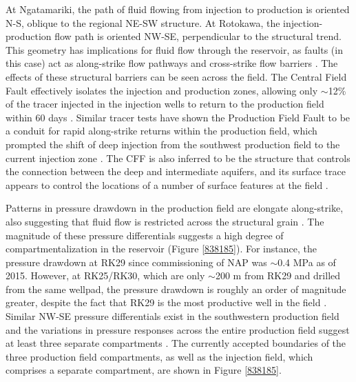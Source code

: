 At Ngatamariki, the path of fluid flowing from injection to production is oriented N-S, oblique to the regional NE-SW structure. At Rotokawa, the injection-production flow path is oriented NW-SE, perpendicular to the structural trend. This geometry has implications for fluid flow through the reservoir, as faults (in this case) act as along-strike flow pathways and cross-strike flow barriers \citep{Addison_2017stanford,McNamara_2015,Sewell_2015}. The effects of these structural barriers can be seen across the field. The Central Field Fault effectively isolates the injection and production zones, allowing only $\sim$12\% of the tracer injected in the injection wells to return to the production field within 60 days \citep{Sewell_2015,addison2015rotokawa}. Similar tracer tests have shown the Production Field Fault to be a conduit for rapid along-strike returns within the production field, which prompted the shift of deep injection from the southwest production field to the current injection zone \citep{Sewell_2015,Addison_2017stanford}. The \acrfull{CFF} is also inferred to be the structure that controls the connection between the deep and intermediate aquifers, and its surface trace appears to control the locations of a number of surface features at the field \citep{winick2011natural}.

Patterns in pressure drawdown in the production field are elongate along-strike, also suggesting that fluid flow is restricted across the structural grain \citep{hernandez2015rotokawa,Sewell_2015,Quinao_2013stanford}. The magnitude of these pressure differentials suggests a high degree of compartmentalization in the reservoir (Figure \ref{838185}). For instance, the pressure drawdown at RK29 since commissioning of NAP was $\sim$0.4 \acrshort{MPa} as of 2015. However, at RK25\slash{RK30}, which are only $\sim$200 m from RK29 and drilled from the same wellpad, the pressure drawdown is roughly an order of magnitude greater, despite the fact that RK29 is the most productive well in the field \citep{Sewell_2015}. Similar NW-SE pressure differentials exist in the southwestern production field and the variations in pressure responses across the entire production field suggest at least three separate compartments \citep{hernandez2015rotokawa}. The currently accepted boundaries of the three production field compartments, as well as the injection field, which comprises a separate compartment, are shown in Figure \ref{838185}.

